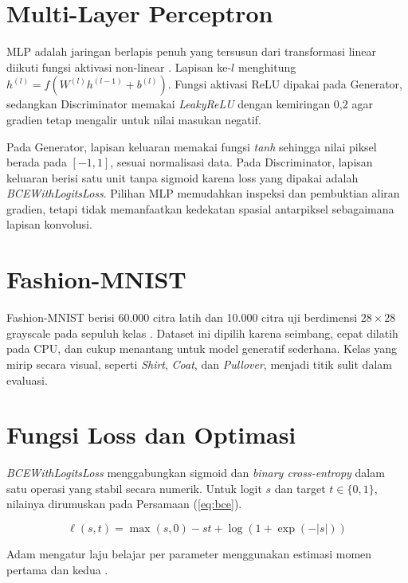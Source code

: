 \section{Multi-Layer Perceptron}

MLP adalah jaringan berlapis penuh yang tersusun dari transformasi linear diikuti fungsi aktivasi non-linear \citep{goodfellow2016deep}. Lapisan ke-$l$ menghitung $h^{(l)} = f(W^{(l)}h^{(l-1)} + b^{(l)})$. Fungsi aktivasi ReLU dipakai pada Generator, sedangkan Discriminator memakai \textit{LeakyReLU} dengan kemiringan 0,2 agar gradien tetap mengalir untuk nilai masukan negatif.

Pada Generator, lapisan keluaran memakai fungsi \textit{tanh} sehingga nilai piksel berada pada $[-1,1]$, sesuai normalisasi data. Pada Discriminator, lapisan keluaran berisi satu unit tanpa sigmoid karena loss yang dipakai adalah \textit{BCEWithLogitsLoss}. Pilihan MLP memudahkan inspeksi dan pembuktian aliran gradien, tetapi tidak memanfaatkan kedekatan spasial antarpiksel sebagaimana lapisan konvolusi.

\section{Fashion-MNIST}

Fashion-MNIST berisi 60.000 citra latih dan 10.000 citra uji berdimensi $28\times28$ grayscale pada sepuluh kelas \citep{xiao2017fashion}. Dataset ini dipilih karena seimbang, cepat dilatih pada CPU, dan cukup menantang untuk model generatif sederhana. Kelas yang mirip secara visual, seperti \textit{Shirt}, \textit{Coat}, dan \textit{Pullover}, menjadi titik sulit dalam evaluasi.

\section{Fungsi Loss dan Optimasi}

\textit{BCEWithLogitsLoss} menggabungkan sigmoid dan \textit{binary cross-entropy} dalam satu operasi yang stabil secara numerik. Untuk logit $s$ dan target $t\in\{0,1\}$, nilainya dirumuskan pada Persamaan (\ref{eq:bce}).

\begin{equation}\label{eq:bce}
\ell(s,t) = \max(s,0) - s t + \log\left(1 + \exp(-|s|)\right)
\end{equation}

Adam mengatur laju belajar per parameter menggunakan estimasi momen pertama dan kedua \citep{kingma2015adam}.

